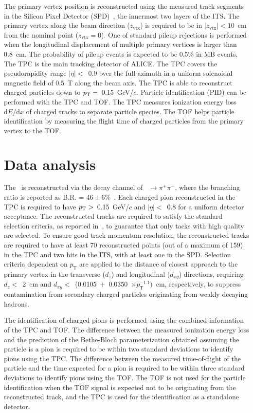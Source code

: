 The primary vertex position is reconstructed using the measured track segments in the Silicon Pixel Detector (SPD)~\cite{Santoro2009:ALICESPD}, the innermost two layers of the ITS. The primary vertex along the beam direction ($z_\mathrm{vtx}$) is required to be in $|z_\mathrm{vtx}|<10$~cm from the nominal point ($z_\mathrm{vtx}=0$). One of standard pileup rejections is performed when the longitudinal displacement of multiple primary vertices is larger than 0.8~cm. The probability of pileup events is expected to be 0.5\% in MB events. The TPC is the main tracking detector of ALICE. The TPC covers the pseudorapidity range $|\eta|<$~0.9 over the full azimuth in a uniform solenoidal magnetic field of 0.5~T along the beam axis. The TPC is able to reconstruct charged particles down to $p_{\rm{T}}=$~0.15~GeV/$c$. Particle identification (PID) can be performed with the TPC and TOF. The TPC measures ionization energy loss $\mathrm{d}E/\mathrm{d}x$ of charged tracks to separate particle species. The TOF helps particle identification by measuring the flight time of charged particles from the primary vertex to the TOF.

\section{Data analysis}

The \fzero~is reconstructed via the decay channel of \fzero~$\rightarrow \pi^{+}\pi^{-}$, where the branching ratio is reported as B.R. = $46\pm6$\%~\cite{Stone:2013eaa}. Each charged pion reconstructed in the TPC is required to have $p_{\rm{T}}>$~0.15~GeV/$c$ and $|\eta|<$~0.8 for a uniform detector acceptance. The reconstructed tracks are required to satisfy the standard selection criteria, as reported in~\cite{ALICE:2022qnb}, to guarantee that only tacks with high quality are selected. To ensure good track momentum resolution, the reconstructed tracks are required to have at least 70 reconstructed points (out of a maximum of 159) in the TPC and two hits in the ITS, with at least one in the SPD. Selection criteria dependent on $p_{\mathrm{T}}$ are applied to the distance of closest approach to the primary vertex in the transverse ($d_{z}$) and longitudinal ($d_{xy}$) directions, requiring $d_{z}<$~2~cm and $d_{xy}<$~(0.0105~$+$~0.0350~$\times p_{\mathrm{T}}^{-1.1})$~cm, respectively, to suppress contamination from secondary charged particles originating from weakly decaying hadrons.

The identification of charged pions is performed using the combined information of the TPC and TOF. The difference between the measured ionization energy loss and the prediction of the Bethe-Bloch parameterization obtained assuming the particle is a pion is required to be within two standard deviations to identify pions using the TPC. The difference between the measured time-of-flight of the particle and the time expected for a pion is required to be within three standard deviations to identify pions using the TOF. The TOF is not used for the particle identification when the TOF signal is expected not to be originating from the reconstructed track, and the TPC is used for the identification as a standalone detector.


